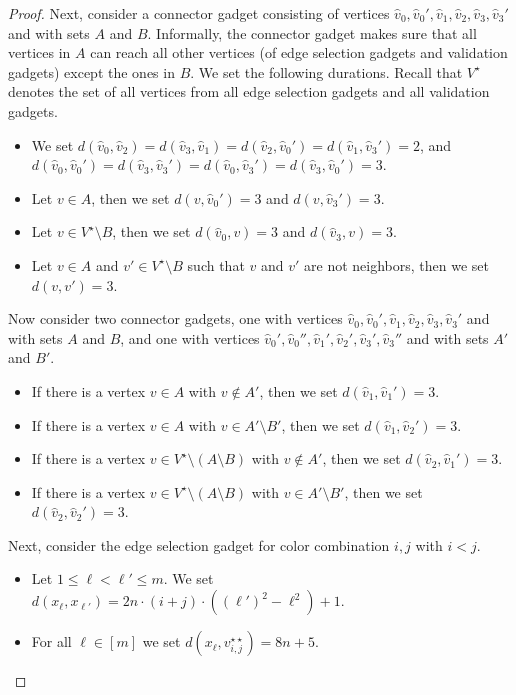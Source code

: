 \documentclass[a4paper,UKenglish,cleveref, autoref, thm-restate]{lipics-v2021}
\begin{document}
\begin{proof}
Next, consider a connector gadget consisting of vertices $\hat{v}_0,\hat{v}_0',\hat{v}_1,\hat{v}_2,\hat{v}_3,\hat{v}_3'$ and with sets $A$ and $B$. Informally, the connector gadget makes sure that all vertices in $A$ can reach all other vertices (of edge selection gadgets and validation gadgets) except the ones in $B$. We set the following durations. Recall that $V^\star$ denotes the set of all vertices from all edge selection gadgets and all validation gadgets.
\begin{itemize}
    \item We set $d(\hat{v}_0,\hat{v}_2)=d(\hat{v}_3,\hat{v}_1)=d(\hat{v}_2,\hat{v}_0')=d(\hat{v}_1,\hat{v}_3')=2$, and $d(\hat{v}_0,\hat{v}_0')=d(\hat{v}_3,\hat{v}_3')=d(\hat{v}_0,\hat{v}_3')=d(\hat{v}_3,\hat{v}_0')=3$.
    \item Let $v\in A$, then we set $d(v,\hat{v}_0')=3$ and $d(v,\hat{v}_3')=3$.
    \item Let $v\in V^\star\setminus B$, then we set $d(\hat{v}_0,v)=3$ and $d(\hat{v}_3,v)=3$.
    \item Let $v\in A$ and $v'\in V^\star\setminus B$ such that $v$ and $v'$ are not neighbors, then we set $d(v,v')=3$.
\end{itemize}
Now consider two connector gadgets, one with vertices $\hat{v}_0,\hat{v}_0',\hat{v}_1,\hat{v}_2,\hat{v}_3,\hat{v}_3'$ and with sets $A$ and $B$, and one with vertices $\hat{v}_0',\hat{v}_0'',\hat{v}_1',\hat{v}_2',\hat{v}_3',\hat{v}_3''$ and with sets $A'$ and $B'$.
\begin{itemize}
    \item If there is a vertex $v\in A$ with $v\notin A'$, then we set $d(\hat{v}_1,\hat{v}_1')=3$.
    \item If there is a vertex $v\in A$ with $v\in A'\setminus B'$, then we set $d(\hat{v}_1,\hat{v}_2')=3$.
    \item If there is a vertex $v\in V^\star\setminus (A\setminus B)$ with $v\notin A'$, then we set $d(\hat{v}_2,\hat{v}_1')=3$.    
    \item If there is a vertex $v\in V^\star\setminus (A\setminus B)$ with $v\in A'\setminus B'$, then we set $d(\hat{v}_2,\hat{v}_2')=3$.
\end{itemize}

Next, consider the edge selection gadget for color combination $i,j$ with $i<j$.
\begin{itemize}
    \item Let $1\le \ell<\ell'\le m$. We set $d(x_\ell,x_{\ell'})=2n\cdot (i+j)\cdot((\ell')^2-\ell^2)+1$.
    \item For all $\ell\in[m]$ we set $d(x_\ell,v_{i,j}^{\star\star})=8n+5$.
\end{itemize}


\end{proof}
\end{document}
